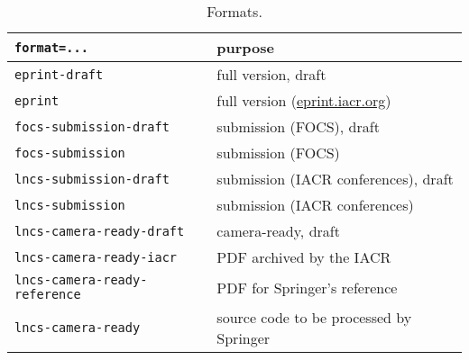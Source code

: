 \begin{table}[hp]
\centering
\capstart
\caption{Formats.}
\label{tab:table1}
\begin{tabular}{ll}
\toprule
\texttt{format=...} & \textbf{purpose} \\
\midrule
\texttt{eprint-draft} & full version, draft \\
\texttt{eprint} &
full version (\href{https://eprint.iacr.org/}{eprint.iacr.org}) \\
\texttt{focs-submission-draft} &
submission (FOCS), draft \\
\texttt{focs-submission} &
submission (FOCS) \\
\texttt{lncs-submission-draft} &
submission (IACR conferences), draft \\
\texttt{lncs-submission} &
submission (IACR conferences) \\
\texttt{lncs-camera-ready-draft} &
camera-ready, draft \\
\texttt{lncs-camera-ready-iacr} &
PDF archived by the IACR \\
\texttt{lncs-camera-ready-reference} &
PDF for Springer's reference \\
\texttt{lncs-camera-ready} &
source code to be processed by Springer \\
\bottomrule
\end{tabular}
\end{table}

